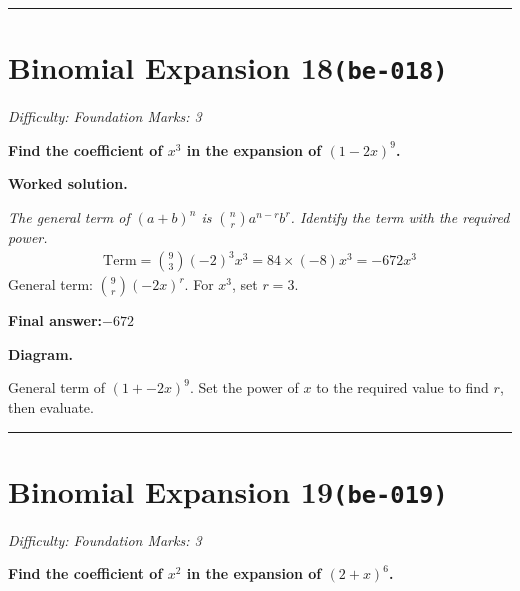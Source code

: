 \documentclass[11pt]{article}
\newcommand{\question}[1]{\par\medskip\noindent\textbf{#1}\par}
\begin{document}
\medskip\hrule

\section*{Binomial Expansion 18\quad\small\texttt{(be-018)}}
\textit{Difficulty: Foundation \quad\textbar\quad Marks: 3}

\question{Find the coefficient of \( x^3 \) in the expansion of \( (1 - 2x)^9 \).}

\textbf{Worked solution.}

\textit{The general term of \((a+b)^n\) is \(\binom{n}{r} a^{n-r} b^r\). Identify the term with the required power.}
\[\begin{gathered}
\text{Term} = \binom{9}{3}(-2)^3 x^3 = 84 \times (-8) x^3 = -672x^3
\end{gathered}\]
General term: \( \binom{9}{r}(-2x)^r \). For \(x^3\), set \(r = 3\).

\begin{answerbox}
\textbf{Final answer:}\quad \(\displaystyle -672\)
\end{answerbox}
\textbf{Diagram.}

\begin{center}
\end{center}
\small General term of $\left(1+-2x\right)^{9}$. Set the power of $x$ to the required value to find $r$, then evaluate.\normalsize

\medskip\hrule

\section*{Binomial Expansion 19\quad\small\texttt{(be-019)}}
\textit{Difficulty: Foundation \quad\textbar\quad Marks: 3}

\question{Find the coefficient of \( x^2 \) in the expansion of \( (2 + x)^6 \).}
\end{document}
